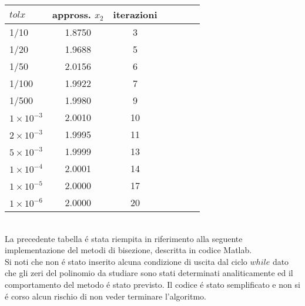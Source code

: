 \begin{tabular}{l*{6}{c}}
 \(tolx\) & appross. \(x_2\) & iterazioni \\
\hline
 1/10 & 1.8750 & 3\\
 1/20 & 1.9688 & 5\\
 1/50 & 2.0156 & 6\\
 1/100 & 1.9922 & 7\\
 1/500 & 1.9980 & 9\\
 \(1 \times 10^{-3}\) & 2.0010 & 10\\
 \(2 \times 10^{-3}\) & 1.9995 & 11\\
 \(5 \times 10^{-3}\) & 1.9999 & 13\\
 \(1 \times 10^{-4}\) & 2.0001 & 14\\
 \(1 \times 10^{-5}\) & 2.0000 & 17\\
 \(1 \times 10^{-6}\) & 2.0000 & 20\\
\end{tabular} \\

\noindent La precedente tabella \'e stata riempita in riferimento alla seguente implementazione del metodi di bisezione, descritta in codice Matlab.\\



\noindent Si noti che non \'e stato inserito alcuna condizione di uscita dal ciclo \(while\) dato che gli zeri del polinomio da studiare sono stati determinati analiticamente ed il comportamento del metodo \'e stato previsto. Il codice \'e stato semplificato e non si \'e corso alcun rischio di non veder terminare l'algoritmo.
